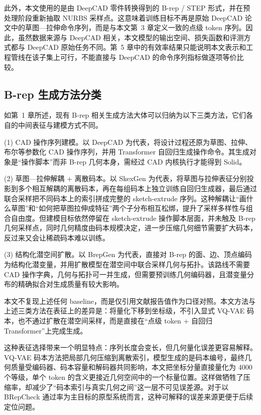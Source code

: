 此外，本文使用的是由 DeepCAD 零件转换得到的 B-rep / STEP 形式，并在预处理阶段重新抽取 NURBS 采样点。这意味着训练目标不再是原始 DeepCAD 论文中的草图—拉伸命令序列，而是与本文第~3 章定义一致的点级 token 序列。因此，虽然数据来源与 DeepCAD 相关，本文模型的输出空间、损失函数和评测方式都与 DeepCAD 原始任务不同。第~5 章中的有效率结果只能说明本文表示和工程管线在该子集上可行，不能直接与 DeepCAD 的命令序列指标做逐项等价比较。

\subsection{B-rep 生成方法分类}

如第~1 章所述，现有 B-rep 相关生成方法大体可以归纳为以下三类方法，它们各自的中间表征与建模方式不同。

(1) CAD 操作序列建模。以 DeepCAD\cite{wu_2021_deepcad} 为代表，将设计过程还原为草图、拉伸、布尔等参数化 CAD 操作序列，并用 Transformer 自回归生成操作命令。其生成对象是“操作脚本”而非 B-rep 几何本身，需经过 CAD 内核执行才能得到 Solid。

(2) 草图—拉伸解耦 + 离散码本。以 SkexGen 为代表，将草图与拉伸表征分别投影到多个相互解耦的离散码本，再在每组码本上独立训练自回归生成器，最后通过联合采样把不同码本上的索引拼成完整的 sketch-extrude 序列。这种解耦让“画什么草图”和“如何把草图拉伸成特征”两个子分布相互松绑，提升了采样多样性与组合自由度。但建模目标依然停留在 sketch-extrude 操作脚本层面，并未触及 B-rep 几何采样点，同时几何精度由码本规模决定，进一步压缩几何细节需要扩大码本，反过来又会让稀疏码本难以训练。

(3) 结构化潜空间扩散。以 BrepGen\cite{xu_2024_brepgen} 为代表，直接对 B-rep 的面、边、顶点编码为结构化潜变量，并用扩散模型在潜空间中联合采样几何与拓扑。该路线不需要 CAD 操作字典，几何与拓扑可一并生成，但需要预训练几何编码器，且潜变量分布的精确拟合对生成质量有较大影响。

本文不复现上述任何 baseline，而是仅引用文献报告值作为口径对照。本文方法与上述三类方法在表征上的差异是：将量化下移到坐标级，不引入显式 VQ-VAE 码本，也不通过扩散在潜空间采样，而是直接在“点级 token + 自回归 Transformer”上完成生成。

这种表征选择带来一个明显特点：序列长度会变长，但几何量化误差更容易解释。VQ-VAE 码本方法把局部几何压缩到离散索引，模型生成的是码本编号，最终几何质量受编码器、码本容量和解码器共同影响，本文把坐标分量直接量化为 4000 个等级，单个 token 的含义更接近几何空间中的一个标量位置。这样做牺牲了压缩率，却减少了“码本索引与真实几何之间”这一层不可见误差源。对于以 BRepCheck 通过率为主目标的原型系统而言，这种可解释的误差来源更便于后续定位问题。

